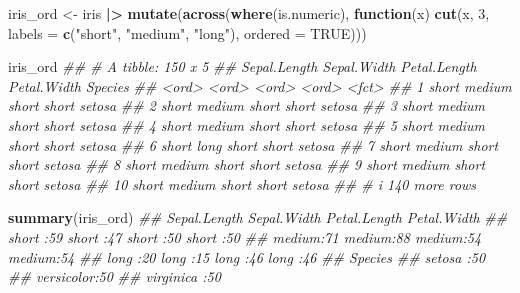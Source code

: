 \documentclass[
  notitlepage]{book}
\newenvironment{Shaded}{\begin{snugshade}}{\end{snugshade}}
\newcommand{\CommentTok}[1]{\textcolor[rgb]{0.56,0.35,0.01}{\textit{#1}}}
\newcommand{\ControlFlowTok}[1]{\textcolor[rgb]{0.13,0.29,0.53}{\textbf{#1}}}
\newcommand{\DataTypeTok}[1]{\textcolor[rgb]{0.13,0.29,0.53}{#1}}
\newcommand{\DecValTok}[1]{\textcolor[rgb]{0.00,0.00,0.81}{#1}}
\newcommand{\ErrorTok}[1]{\textcolor[rgb]{0.64,0.00,0.00}{\textbf{#1}}}
\newcommand{\KeywordTok}[1]{\textcolor[rgb]{0.13,0.29,0.53}{\textbf{#1}}}
\newcommand{\NormalTok}[1]{#1}
\newcommand{\OperatorTok}[1]{\textcolor[rgb]{0.81,0.36,0.00}{\textbf{#1}}}
\newcommand{\OtherTok}[1]{\textcolor[rgb]{0.56,0.35,0.01}{#1}}
\newcommand{\StringTok}[1]{\textcolor[rgb]{0.31,0.60,0.02}{#1}}
\begin{document}
\begin{Shaded}
\begin{Highlighting}[]
\NormalTok{iris\_ord \textless{}{-}}\StringTok{ }\NormalTok{iris }\OperatorTok{|}\ErrorTok{\textgreater{}}\StringTok{ }
\StringTok{  }\KeywordTok{mutate}\NormalTok{(}\KeywordTok{across}\NormalTok{(}\KeywordTok{where}\NormalTok{(is.numeric), }
    \ControlFlowTok{function}\NormalTok{(x) }\KeywordTok{cut}\NormalTok{(x, }\DecValTok{3}\NormalTok{, }
                    \DataTypeTok{labels =} \KeywordTok{c}\NormalTok{(}\StringTok{"short"}\NormalTok{, }\StringTok{"medium"}\NormalTok{, }\StringTok{"long"}\NormalTok{), }
                    \DataTypeTok{ordered =} \OtherTok{TRUE}\NormalTok{)))}

\NormalTok{iris\_ord}
\CommentTok{\#\# \# A tibble: 150 x 5}
\CommentTok{\#\#    Sepal.Length Sepal.Width Petal.Length Petal.Width Species}
\CommentTok{\#\#    \textless{}ord\textgreater{}        \textless{}ord\textgreater{}       \textless{}ord\textgreater{}        \textless{}ord\textgreater{}       \textless{}fct\textgreater{}  }
\CommentTok{\#\#  1 short        medium      short        short       setosa }
\CommentTok{\#\#  2 short        medium      short        short       setosa }
\CommentTok{\#\#  3 short        medium      short        short       setosa }
\CommentTok{\#\#  4 short        medium      short        short       setosa }
\CommentTok{\#\#  5 short        medium      short        short       setosa }
\CommentTok{\#\#  6 short        long        short        short       setosa }
\CommentTok{\#\#  7 short        medium      short        short       setosa }
\CommentTok{\#\#  8 short        medium      short        short       setosa }
\CommentTok{\#\#  9 short        medium      short        short       setosa }
\CommentTok{\#\# 10 short        medium      short        short       setosa }
\CommentTok{\#\# \# i 140 more rows}
\end{Highlighting}
\end{Shaded}

\begin{Shaded}
\begin{Highlighting}[]
\KeywordTok{summary}\NormalTok{(iris\_ord)}
\CommentTok{\#\#  Sepal.Length Sepal.Width Petal.Length Petal.Width}
\CommentTok{\#\#  short :59    short :47   short :50    short :50  }
\CommentTok{\#\#  medium:71    medium:88   medium:54    medium:54  }
\CommentTok{\#\#  long  :20    long  :15   long  :46    long  :46  }
\CommentTok{\#\#        Species  }
\CommentTok{\#\#  setosa    :50  }
\CommentTok{\#\#  versicolor:50  }
\CommentTok{\#\#  virginica :50}
\end{Highlighting}
\end{Shaded}
\end{document}
